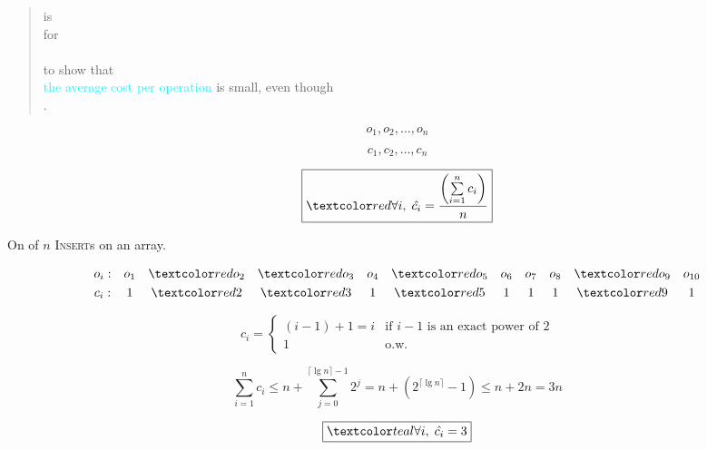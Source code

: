 
\begin{frame}{}
  \begin{quote}
    \centering
    {\large
       is \\[6pt]
       for \\[6pt]
       \\[6pt]
       to show that \\[6pt]
      \textcolor{cyan}{the average cost per operation} is small, even though \\[6pt]
      .
    }
  \end{quote}
\end{frame}

\begin{frame}{}
  \centerline{}

  \[
    o_1, o_2, \ldots, o_n
  \]

  \[
    c_1, c_2, \ldots, c_n
  \]

  \pause
  \[
    \boxed{\red{\forall i,\; \hat{c_i} = \frac{\left(\sum\limits_{i = 1}^{n} c_i\right)}{n}}}
  \]
\end{frame}

\begin{frame}{}
  \centerline{}

  \pause
  \vspace{0.30cm}
  \centerline{On  of $n$ \textsc{Insert}s on an  array.}

  \pause
  \vspace{0.30cm}
  \[
    \begin{array}{ccccccccccc}
      o_i:  & o_1 & \red{o_2} & \red{o_3} & o_4 & \red{o_5} & o_6 & o_7 & o_8 & \red{o_9} & o_{10} \\[3pt]
      c_i:  & 1 & \red{2} & \red{3} & 1 & \red{5} & 1 & 1 & 1 & \red{9} & 1  \\
    \end{array}
  \]

  \pause
  \vspace{0.30cm}
  \begin{displaymath}
    c_i = \left\{ \begin{array}{ll}
      (i-1)+1 = i & \textrm{if $i - 1$ is an exact power of 2}\\
      1 & \textrm{o.w.}
    \end{array} \right.
  \end{displaymath}

  \pause
  \vspace{0.30cm}
  \[
    \sum_{i=1}^{n} c_i \le n + \sum_{j=0}^{\lceil \lg n \rceil - 1} 2^{j} = n +
    (2^{\lceil \lg n \rceil} - 1) \le n + 2n = 3n
  \]

  \pause
  \[
    \boxed{\teal{\forall i,\; \hat{c_i} = 3}}
  \]
\end{frame}

